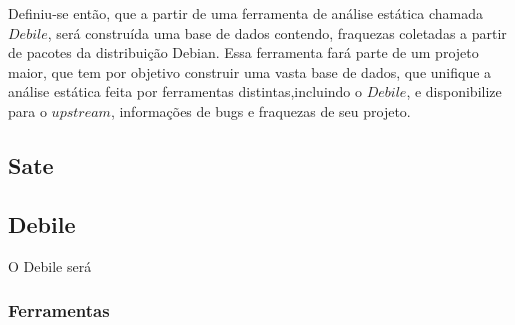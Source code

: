 
Definiu-se então, que a partir de uma ferramenta de análise estática chamada $Debile$, será construída uma base de dados contendo, fraquezas coletadas a partir de pacotes da distribuição Debian. Essa ferramenta fará parte de um projeto maior, que tem por objetivo construir uma vasta base de dados, que unifique a análise estática feita por ferramentas distintas,incluindo o $Debile$, e disponibilize para o $upstream$, informações de bugs e fraquezas de seu projeto.

\subsection{Sate}

\subsection{Debile}

O Debile será


\subsubsection{Ferramentas}
